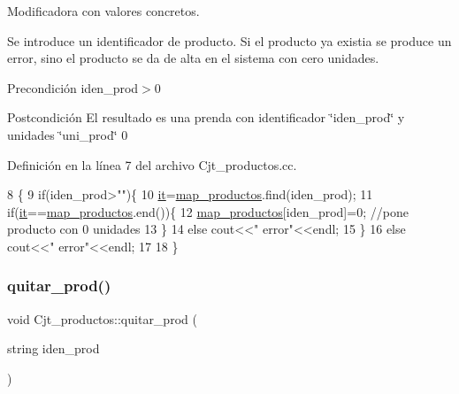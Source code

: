 Modificadora con valores concretos. 

Se introduce un identificador de producto. Si el producto ya existia se produce un error, sino el producto se da de alta en el sistema con cero unidades. \begin{DoxyPrecond}{Precondición}
iden\+\_\+prod$>$0 
\end{DoxyPrecond}
\begin{DoxyPostcond}{Postcondición}
El resultado es una prenda con identificador \char`\"{}iden\+\_\+prod\char`\"{} y unidades \char`\"{}uni\+\_\+prod\char`\"{} 0 
\end{DoxyPostcond}


Definición en la línea 7 del archivo Cjt\+\_\+productos.\+cc.


\begin{DoxyCode}
8 \{
9   \textcolor{keywordflow}{if}(iden\_prod>\textcolor{stringliteral}{""})\{
10     \hyperlink{class_cjt__productos_adedbe2194ed053eb446ec367e6d5e60e}{it}=\hyperlink{class_cjt__productos_a44e63c644fdec6cff81dcdb3cf79860c}{map\_productos}.find(iden\_prod);
11     \textcolor{keywordflow}{if}(\hyperlink{class_cjt__productos_adedbe2194ed053eb446ec367e6d5e60e}{it}==\hyperlink{class_cjt__productos_a44e63c644fdec6cff81dcdb3cf79860c}{map\_productos}.end())\{
12       \hyperlink{class_cjt__productos_a44e63c644fdec6cff81dcdb3cf79860c}{map\_productos}[iden\_prod]=0; \textcolor{comment}{//pone producto con 0 unidades}
13     \}
14     \textcolor{keywordflow}{else} cout<<\textcolor{stringliteral}{"  error"}<<endl;
15   \}
16   \textcolor{keywordflow}{else}  cout<<\textcolor{stringliteral}{"  error"}<<endl;
17   
18 \}
\end{DoxyCode}
\mbox{\label{class_cjt__productos_a2da6626c288772c1169dcf32c39202e6}} 
\subsubsection{\texorpdfstring{quitar\+\_\+prod()}{quitar\_prod()}}
{\footnotesize\ttfamily void Cjt\+\_\+productos\+::quitar\+\_\+prod (\begin{DoxyParamCaption}\item[{string}]{iden\+\_\+prod }\end{DoxyParamCaption})}



